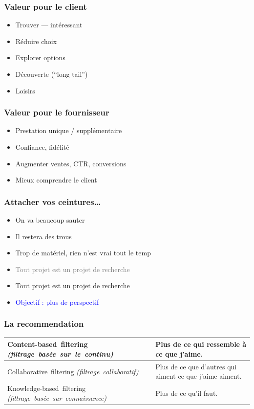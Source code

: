\documentclass[t]{beamer}
\newcommand\topstrut{\rule{0pt}{2.6ex}}
\newcommand\bottomstrut{\rule[-1.2ex]{0pt}{0pt}}
\newcommand\blue[1]{\textcolor{blue}{#1}}
\newcommand\gray[1]{\textcolor{gray}{#1}}
\begin{document}
\begin{frame}
  \frametitle{Valeur pour le client}
  \begin{itemize}
  \item Trouver --- intéressant
  \item Réduire choix
  \item Explorer options
  \item Découverte (``long tail'')
  \item Loisirs
  \end{itemize}
\end{frame}

\begin{frame}
  \frametitle{Valeur pour le fournisseur}

  \begin{itemize}
  \item Prestation unique / supplémentaire
  \item Confiance, fidélité
  \item Augmenter ventes, CTR, conversions
  \item Mieux comprendre le client
  \end{itemize}
\end{frame}

\begin{frame}
  \frametitle{Attacher vos ceintures\dots}

  \begin{itemize}
  \item On va beaucoup sauter
  \item Il restera des trous
  \item Trop de matériel, rien n'est vrai tout le temp
  \item<2> \gray{Tout projet est un projet de recherche}
  \item<3> Tout projet est un projet de recherche
  \item<3> \blue{Objectif : plus de perspectif}
  \end{itemize}
\end{frame}


\begin{frame}
  \frametitle{La recommendation}

  \begin{tabular}{|p{5.7cm}|p{4cm}|}
    \hline
    \topstrut\hbox{Content-based filtering}
    \hbox{\it (filtrage basée sur le continu)}
    &
    Plus de ce qui ressemble à ce que j'aime.\bottomstrut
    \\
    \hline
    \topstrut\hbox{Collaborative filtering}
    \hbox{\it (filtrage collaboratif)}
    &
    Plus de ce que d'autres qui aiment ce que j'aime aiment.\bottomstrut
    \\
    \hline
    \topstrut\hbox{Knowledge-based filtering}
    \hbox{\it (filtrage basée sur connaissance)}\bottomstrut
    &
    Plus de ce qu'il faut.\bottomstrut
    \\
    \hline
  \end{tabular}
\end{frame}
\end{document}
